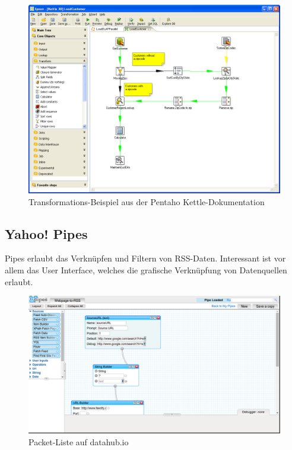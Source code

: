 \begin{figure}[H]
    \centering
    \includegraphics[width=2\linewidth/3]{fig/kettle-spoon-transformation}
    \caption{Transformations-Beispiel aus der Pentaho Kettle-Dokumentation}
\end{figure}

\subsection{Yahoo! Pipes}
Pipes erlaubt das Verknüpfen und Filtern von RSS-Daten. Interessant ist vor allem das User Interface, welches die grafische Verknüpfung von Datenquellen erlaubt.

\begin{figure}[H]
    \centering
    \includegraphics[width=2\linewidth/3]{fig/yahoo-pipes}
    \caption{Packet-Liste auf datahub.io}
\end{figure}

